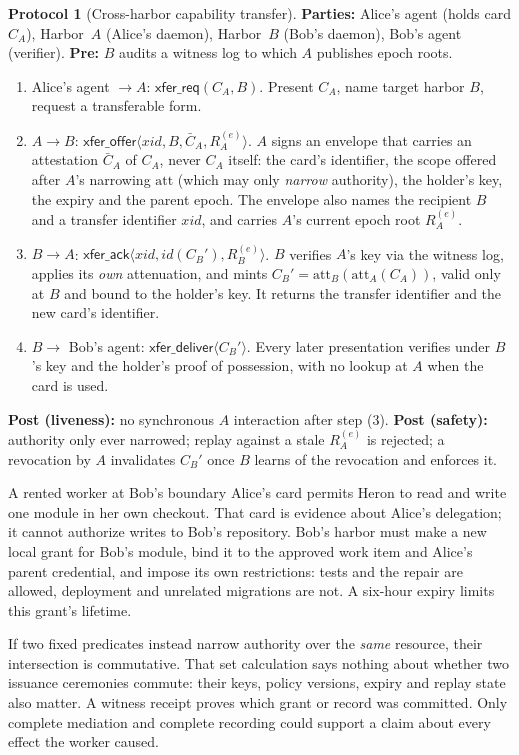 \documentclass[11pt,a4paper]{article}
\theoremstyle{definition}
\theoremstyle{definition}
\newtheorem{protocol}{Protocol}[section]
\theoremstyle{remark}
\begin{document}
\ifpdbook\else
\begin{protocol}[Cross-harbor capability transfer]\label{prot:xfer}
\textbf{Parties:} Alice's agent (holds card $C_A$), Harbor~$A$ (Alice's daemon),
Harbor~$B$ (Bob's daemon), Bob's agent (verifier). \textbf{Pre:} $B$ audits a
witness log to which $A$ publishes epoch roots.
\begin{enumerate}[leftmargin=2.0em,itemsep=1pt,topsep=2pt]
  \item Alice's agent $\to A$: $\mathsf{xfer\_req}(C_A, B)$. Present $C_A$, name
    target harbor $B$, request a transferable form.
  \item $A \to B$: $\mathsf{xfer\_offer}\langle \mathit{xid}, B, \bar{C}_A, R_A^{(e)}\rangle$.
    $A$ signs an envelope that carries an attestation $\bar{C}_A$ of $C_A$,
    never $C_A$ itself: the card's identifier, the scope offered after $A$'s
    narrowing $\mathrm{att}$ (which may only \emph{narrow} authority), the
    holder's key, the expiry and the parent epoch. The envelope also names the
    recipient $B$ and a transfer identifier $\mathit{xid}$, and carries $A$'s
    current epoch root $R_A^{(e)}$.
  \item $B \to A$: $\mathsf{xfer\_ack}\langle \mathit{xid}, \mathit{id}(C_B'), R_B^{(e)}\rangle$. $B$
    verifies $A$'s key via the witness log, applies its \emph{own} attenuation, and
    mints $C_B' = \mathrm{att}_B(\mathrm{att}_A(C_A))$, valid only at $B$ and
    bound to the holder's key. It returns the transfer identifier and the new
    card's identifier.
  \item $B \to$ Bob's agent: $\mathsf{xfer\_deliver}\langle C_B'\rangle$. Every
    later presentation verifies under $B$'s key and the holder's proof of
    possession, with no lookup at $A$ when the card is used.
\end{enumerate}
\textbf{Post (liveness):} no synchronous $A$ interaction after step (3).
\textbf{Post (safety):} authority only ever narrowed; replay against a stale
$R_A^{(e)}$ is rejected; a revocation by $A$ invalidates $C_B'$ once $B$ learns of the
revocation and enforces it.
\end{protocol}
\fi

\begin{pdexample}{A rented worker at Bob's boundary}
Alice's card permits Heron to read and write one module in her own checkout.
That card is evidence about Alice's delegation; it cannot authorize writes to
Bob's repository. Bob's harbor must make a new local grant for Bob's module,
bind it to the approved work item and Alice's parent credential, and impose
its own restrictions: tests and the repair are allowed, deployment and
unrelated migrations are not. A six-hour expiry limits this grant's lifetime.

If two fixed predicates instead narrow authority over the \emph{same}
resource, their intersection is commutative. That set calculation says nothing
about whether two issuance ceremonies commute: their keys, policy versions,
expiry and replay state also matter. A witness receipt proves which grant or
record was committed. Only complete mediation and complete recording could
support a claim about every effect the worker caused.
\end{pdexample}
\end{document}
